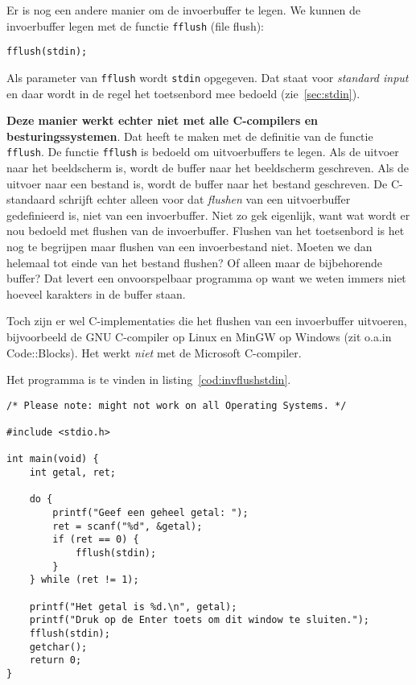 Er is nog een andere manier om de invoerbuffer te legen. We kunnen de invoerbuffer legen met de functie \texttt{fflush} (file flush):

\hspace*{1em}\texttt{fflush(stdin);}

Als parameter van \texttt{fflush} wordt \texttt{stdin} opgegeven. Dat staat voor \textsl{standard input} en daar wordt in de regel het toetsenbord mee bedoeld (zie~\ref{sec:stdin}).

\textbf{Deze manier werkt echter niet met alle C-compilers en besturingssystemen}. Dat heeft te maken met de definitie van de functie \texttt{fflush}. De functie \texttt{fflush} is bedoeld om uitvoerbuffers te legen. Als de uitvoer naar het beeldscherm is, wordt de buffer naar het beeldscherm geschreven. Als de uitvoer naar een bestand is, wordt de buffer naar het bestand geschreven. De C-standaard schrijft echter alleen voor dat \textsl{flushen} van een uitvoerbuffer gedefinieerd is, niet van een invoerbuffer. Niet zo gek eigenlijk, want wat wordt er nou bedoeld met flushen van de invoerbuffer. Flushen van het toetsenbord is het nog te begrijpen maar flushen van een invoerbestand niet. Moeten we dan helemaal tot einde van het bestand flushen? Of alleen maar de bijbehorende buffer? Dat levert een onvoorspelbaar programma op want we weten immers niet hoeveel karakters in de buffer staan.

Toch zijn er wel C-implementaties die het flushen van een invoerbuffer uitvoeren, bijvoorbeeld de GNU C-compiler op Linux en MinGW op Windows (zit o.a.\@ in Code::Blocks). Het werkt \textsl{niet} met de Microsoft C-compiler.

Het programma is te vinden in listing~\ref{cod:invflushstdin}.

\begin{lstlisting}[caption=Leegmaken van de invoerbuffer van \texttt{stdin}.,label=cod:invflushstdin]
/* Please note: might not work on all Operating Systems. */

#include <stdio.h>

int main(void) {
    int getal, ret;
    
    do {
        printf("Geef een geheel getal: ");
        ret = scanf("%d", &getal);
        if (ret == 0) {
            fflush(stdin);
        }
    } while (ret != 1);

    printf("Het getal is %d.\n", getal);
    printf("Druk op de Enter toets om dit window te sluiten.");
    fflush(stdin);
    getchar();
    return 0;
}
\end{lstlisting}



